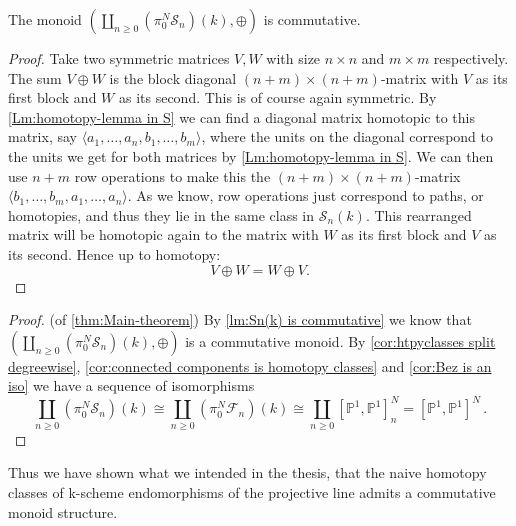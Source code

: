%
\begin{lemma}\label{lm:Sn(k) is commutative}
The monoid \((\displaystyle\coprod_{n\geq 0}(\pi^N_0 \mathcal{S}_n)(k),\oplus)\) is commutative.
%
\begin{proof}
%
Take two symmetric matrices \(V, W\) with size \(n\times n\) and \(m \times m\) respectively. The sum \(V\oplus W\) is the block diagonal \((n+m)\times (n+m)\)-matrix with \(V\) as its first block and \(W\) as its second. This is of course again symmetric. By \ref{Lm:homotopy-lemma in S} we can find a diagonal matrix homotopic to this matrix, say \(\langle a_1, \dots ,a_{n}, b_1, \dots ,b_{m}\rangle \), where the units on the diagonal correspond to the units we get for both matrices by \ref{Lm:homotopy-lemma in S}. We can then use \(n+m\) row operations to make this the \((n+m)\times (n+m)\)-matrix \(\langle b_1, \dots , b_{m}, a_1, \dots , a_{n}\rangle \). As we know, row operations just correspond to paths, or homotopies, and thus they lie in the same class in \(\mathcal{S}_n(k)\). This rearranged matrix will be homotopic again to the matrix with \(W\) as its first block and \(V\) as its second.  Hence up to homotopy:
%
\begin{equation*}
    V\oplus W = W\oplus V.
\end{equation*}
%
\end{proof}
%
\end{lemma}
%
\begin{proof}(of \cref{thm:Main-theorem})\label{pf:proof of main thm}
By \ref{lm:Sn(k) is commutative} we know that \((\displaystyle\coprod_{n\geq 0}(\pi^N_0 \mathcal{S}_n)(k),\oplus)\) is a commutative monoid. By \ref{cor:htpyclasses split degreewise}, \ref{cor:connected components is homotopy classes} and \cref{cor:Bez is an iso} we have a sequence of isomorphisms 
%
\begin{equation*}
%
    \displaystyle\coprod_{n\geq 0}(\pi^N_0 \mathcal{S}_n)(k) \cong \displaystyle\coprod_{n\geq 0}(\pi_0^N\mathcal{F}_n)(k) \cong  \displaystyle\coprod_{n\geq 0}[\mathbb{P}^1,\mathbb{P}^1]^N_n
    = [\mathbb{P}^1,\mathbb{P}^1]^N \,.
%
\end{equation*}
%
\end{proof}
%
Thus we have shown what we intended in the thesis, that the naive homotopy classes of k-scheme endomorphisms of the projective line admits a commutative monoid structure. 
%

